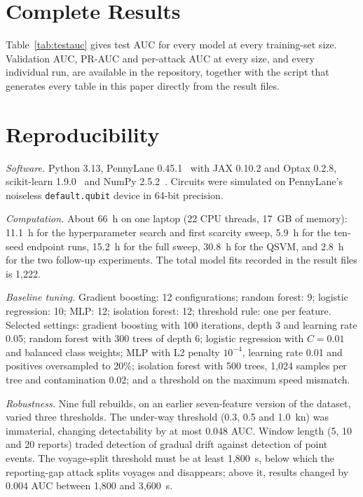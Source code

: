 \documentclass[journal]{IEEEtran}
\begin{document}
\section{Complete Results}
\label{app:results}
Table~\ref{tab:testauc} gives test AUC for every model at every training-set
size. Validation AUC, PR-AUC and per-attack AUC at every size, and every
individual run, are available in the repository, together with the script that
generates every table in this paper directly from the result files.

\section{Reproducibility}
\label{app:repro}
\textit{Software.} Python 3.13, PennyLane 0.45.1~\cite{bergholm2018pennylane}
with JAX 0.10.2 and Optax 0.2.8, scikit-learn 1.9.0~\cite{pedregosa2011sklearn}
and NumPy 2.5.2~\cite{harris2020numpy}. Circuits were simulated on PennyLane's
noiseless \texttt{default.qubit} device in 64-bit precision.

\textit{Computation.} About 66~h on one laptop (22 CPU threads, 17~GB of
memory): 11.1~h for the hyperparameter search and first scarcity sweep, 5.9~h
for the ten-seed endpoint runs, 15.2~h for the full sweep, 30.8~h for the QSVM,
and 2.8~h for the two follow-up experiments. The total model fits recorded in
the result files is 1,222.

\textit{Baseline tuning.} Gradient boosting: 12 configurations; random forest:
9; logistic regression: 10; MLP: 12; isolation forest: 12; threshold rule: one
per feature. Selected settings: gradient boosting with 100 iterations, depth 3
and learning rate 0.05; random forest with 300 trees of depth 6; logistic
regression with $C=0.01$ and balanced class weights; MLP with L2 penalty
$10^{-4}$, learning rate 0.01 and positives oversampled to 20\%; isolation
forest with 500 trees, 1,024 samples per tree and contamination 0.02; and a
threshold on the maximum speed mismatch.

\textit{Robustness.} Nine full rebuilds, on an earlier seven-feature version of
the dataset, varied three thresholds. The under-way threshold (0.3, 0.5 and
1.0~kn) was immaterial, changing detectability by at most 0.048 AUC. Window
length (5, 10 and 20 reports) traded detection of gradual drift against
detection of point events. The voyage-split threshold must be at least
1,800~s, below which the reporting-gap attack splits voyages and disappears;
above it, results changed by 0.004 AUC between 1,800 and 3,600~s.
\end{document}
